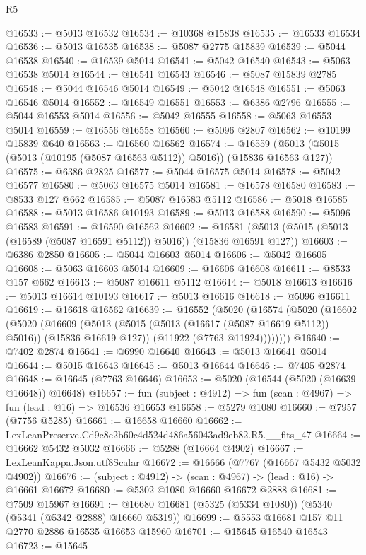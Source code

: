 \begin{lexlean}{R5}
\begin{coremodule}
@16533 := @5013 @16532
@16534 := @10368 @15838
@16535 := @16533 @16534
@16536 := @5013 @16535
@16538 := @5087 @2775 @15839
@16539 := @5044 @16538
@16540 := @16539 @5014
@16541 := @5042 @16540
@16543 := @5063 @16538 @5014
@16544 := @16541 @16543
@16546 := @5087 @15839 @2785
@16548 := @5044 @16546 @5014
@16549 := @5042 @16548
@16551 := @5063 @16546 @5014
@16552 := @16549 @16551
@16553 := @6386 @2796
@16555 := @5044 @16553 @5014
@16556 := @5042 @16555
@16558 := @5063 @16553 @5014
@16559 := @16556 @16558
@16560 := @5096 @2807
@16562 := @10199 @15839 @640
@16563 := @16560 @16562
@16574 := @16559 (@5013 (@5015 (@5013 (@10195 (@5087 @16563 @5112)) @5016)) (@15836 @16563 @127))
@16575 := @6386 @2825
@16577 := @5044 @16575 @5014
@16578 := @5042 @16577
@16580 := @5063 @16575 @5014
@16581 := @16578 @16580
@16583 := @8533 @127 @662
@16585 := @5087 @16583 @5112
@16586 := @5018 @16585
@16588 := @5013 @16586 @10193
@16589 := @5013 @16588
@16590 := @5096 @16583
@16591 := @16590 @16562
@16602 := @16581 (@5013 (@5015 (@5013 (@16589 (@5087 @16591 @5112)) @5016)) (@15836 @16591 @127))
@16603 := @6386 @2850
@16605 := @5044 @16603 @5014
@16606 := @5042 @16605
@16608 := @5063 @16603 @5014
@16609 := @16606 @16608
@16611 := @8533 @157 @662
@16613 := @5087 @16611 @5112
@16614 := @5018 @16613
@16616 := @5013 @16614 @10193
@16617 := @5013 @16616
@16618 := @5096 @16611
@16619 := @16618 @16562
@16639 := @16552
    (@5020
      (@16574
        (@5020
          (@16602
            (@5020
              (@16609
                (@5013 (@5015 (@5013 (@16617 (@5087 @16619 @5112)) @5016)) (@15836 @16619 @127))
                (@11922 (@7763 @11924))))))))
@16640 := @7402 @2874
@16641 := @6990 @16640
@16643 := @5013 @16641 @5014
@16644 := @5015 @16643
@16645 := @5013 @16644
@16646 := @7405 @2874
@16648 := @16645 (@7763 @16646)
@16653 := @5020 (@16544 (@5020 (@16639 @16648)) @16648)
@16657 := fun (subject : @4912) => fun (scan : @4967) => fun (lead : @16) => @16536 @16653
@16658 := @5279 @1080
@16660 := @7957 (@7756 @5285)
@16661 := @16658 @16660
@16662 := LexLeanPreserve.Cd9c8c2b60c4d524d486a56043ad9eb82.R5.__fits_47
@16664 := @16662 @5432 @5032
@16666 := @5288 (@16664 @4902)
@16667 := LexLeanKappa.Json.utf8Scalar
@16672 := @16666 (@7767 (@16667 @5432 @5032 @4902))
@16676 := (subject : @4912) -> (scan : @4967) -> (lead : @16) -> @16661 @16672
@16680 := @5302 @1080 @16660 @16672 @2888
@16681 := @7509 @15967
@16691 := @16680 @16681 (@5325 (@5334 @1080)) (@5340 (@5341 (@5342 @2888) @16660 @5319))
@16699 := @5553 @16681 @157 @11 @2770 @2886 @16535 @16653 @15960
@16701 := @15645 @16540 @16543
@16723 := @15645

\end{coremodule}
\end{lexlean}
